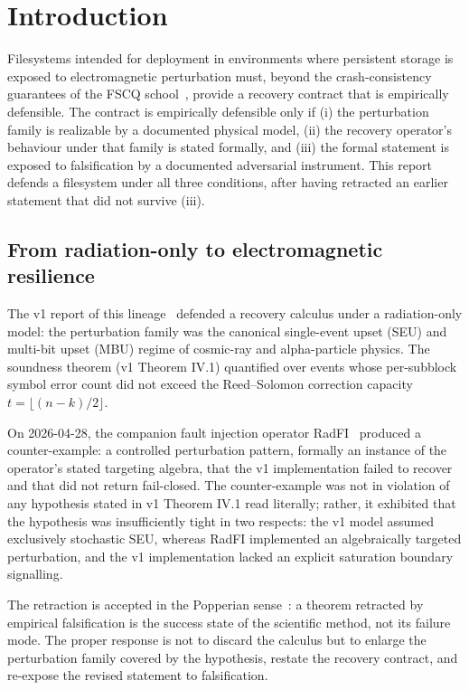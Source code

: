 \section{Introduction}\label{sec:intro}

Filesystems intended for deployment in environments where persistent
storage is exposed to electromagnetic perturbation must, beyond the
crash-consistency guarantees of the FSCQ school~\cite{chen2015fscq},
provide a recovery contract that is empirically defensible. The
contract is empirically defensible only if (i) the perturbation
family is realizable by a documented physical model, (ii) the
recovery operator's behaviour under that family is stated
formally, and (iii) the formal statement is exposed to falsification
by a documented adversarial instrument. This report defends a
filesystem under all three conditions, after having retracted an
earlier statement that did not survive (iii).

\subsection{From radiation-only to electromagnetic resilience}

The v1 report of this lineage~\cite{desbrieres2026ftrfs} defended a
recovery calculus under a radiation-only model: the perturbation
family was the canonical single-event upset (SEU) and multi-bit
upset (MBU) regime of cosmic-ray and alpha-particle physics. The
soundness theorem (v1 Theorem IV.1) quantified over events whose
per-subblock symbol error count did not exceed the Reed--Solomon
correction capacity \(t = \lfloor (n-k)/2 \rfloor\).

On 2026-04-28, the companion fault injection operator
RadFI~\cite{desbrieres2026radfi} produced a counter-example: a
controlled perturbation pattern, formally an instance of the
operator's stated targeting algebra, that the v1 implementation
failed to recover and that did not return fail-closed. The
counter-example was not in violation of any hypothesis stated in
v1 Theorem IV.1 read literally; rather, it exhibited that the
hypothesis was insufficiently tight in two respects: the v1 model
assumed exclusively stochastic SEU, whereas RadFI implemented an
algebraically targeted perturbation, and the v1 implementation
lacked an explicit saturation boundary signalling.

The retraction is accepted in the Popperian
sense~\cite{popper1959logic}: a theorem retracted by empirical
falsification is the success state of the scientific method, not
its failure mode. The proper response is not to discard the
calculus but to enlarge the perturbation family covered by the
hypothesis, restate the recovery contract, and re-expose the
revised statement to falsification.

